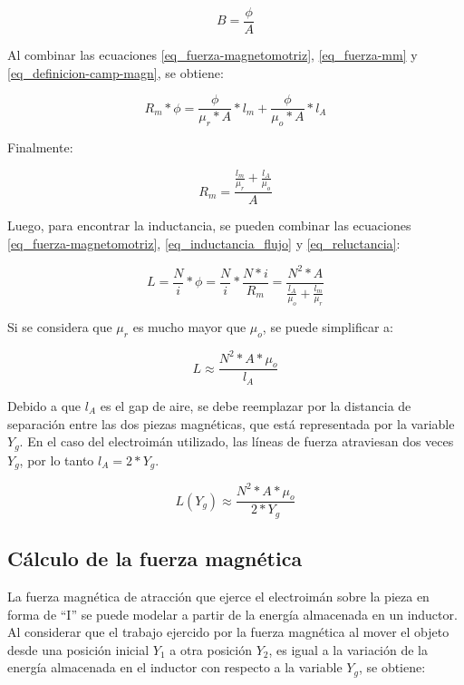 \begin{equation}\label{eq_definicion-camp-magn}
	B=\frac{\phi}{A}
\end{equation}

Al combinar las ecuaciones \ref{eq_fuerza-magnetomotriz}, \ref{eq_fuerza-mm} y \ref{eq_definicion-camp-magn}, se obtiene:

\begin{equation}
		R_{m}*\phi=\frac{\phi}{\mu_{r}*A}*l_{m}+\frac{\phi}{\mu_{o}*A}*l_{A}
\end{equation}

\noindent Finalmente:

\begin{equation} \label{eq_reluctancia}
	R_{m}=\frac{\frac{l_{m}}{\mu_{r}}+\frac{l_{A}}{\mu_{o}}}{A}
\end{equation}

\noindent Luego, para encontrar la inductancia, se pueden combinar las ecuaciones  \ref{eq_fuerza-magnetomotriz}, \ref{eq_inductancia_flujo} y \ref{eq_reluctancia}:

\begin{equation}\label{eq_inductancia_2}
	L=\frac{N}{i}*\phi=\frac{N}{i}*\frac{N*i}{R_{m}}=\frac{N^{2}*A}{\frac{l_{A}}{\mu_{o}}+\frac{l_{m}}{\mu_{r}}}
\end{equation}

\noindent Si se considera que $\mu_{r}$ es mucho mayor que $\mu_{o}$, se puede simplificar a:

\begin{equation} \label{eq_inductancia_gap}
	L\approx\frac{N^{2}*A*\mu_{o}}{l_{A}}
\end{equation}

\noindent \noindent Debido a que $l_{A}$ es el gap de aire, se debe reemplazar por la distancia de separación entre las dos piezas magnéticas, que está representada por la variable $Y_{g}$. En el caso del electroimán utilizado, las líneas de fuerza atraviesan dos veces $Y_{g}$, por lo tanto $l_{A}=2*Y_{g}$.


\begin{equation}\label{eq_inductancia_vs_y}
		L(Y_g)\approx\frac{{N^{2}*A*\mu_{o}}}{2*Y_{g}}
\end{equation}

\subsection{Cálculo de la fuerza magnética}

\noindent La fuerza magnética de atracción que ejerce el electroimán sobre la pieza en forma de ``I'' se puede modelar a partir de la energía almacenada en un inductor. Al considerar que el trabajo ejercido por la fuerza magnética al mover el objeto desde una posición inicial $Y_{1}$ a otra posición $Y_{2}$, es igual a la variación de la energía almacenada en el inductor con respecto a la variable $Y_g$, se obtiene:

